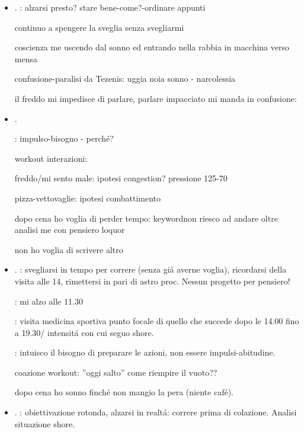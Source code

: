\begin{itemize}
insicurezza-frustrazione-impotenza: non ho capito come prepararmi!

\item {}.
: alzarsi presto? stare bene-come?-ordinare appunti

continuo a spengere la sveglia senza svegliarmi

coscienza me uscendo dal sonno ed entrando nella rabbia in macchina verso mensa 

confusione-paralisi da Tezenis: uggia noia sonno - narcolessia

il freddo mi impedisce di parlare, parlare impacciato mi manda in confusione: 

\item {}.

: impulso-bisogno - perch\'e?

workout interazioni: 

freddo/mi sento male: ipotesi congestion? pressione 125-70

pizza-vettovaglie: ipotesi combattimento 

dopo cena ho voglia di perder tempo: keyword{non riesco ad andare oltre analisi me con pensiero loquor}

non ho voglia di scrivere altro

\item {}.
: svegliarsi in tempo per correre (senza gi\'a averne voglia), ricordarsi della visita alle 14, rimettersi in pari di astro proc. Nessun progetto per pensiero!

: mi alzo alle 11.30

: visita medicina sportiva punto focale di quello che succede dopo le 14.00 fino a 19.30/ intensit\'a con cui seguo shore.

: intuisco il bisogno di preparare le azioni, non essere impulsi-abitudine.

coazione workout: ''oggi salto'' come riempire il vuoto??

dopo cena ho sonno finch\'e non mangio la pera (niente caf\'e).

\item {}.
: obiettivazione rotonda, alzarsi in realt\'a: correre prima di colazione. Analisi situazione shore.


\end{itemize}
